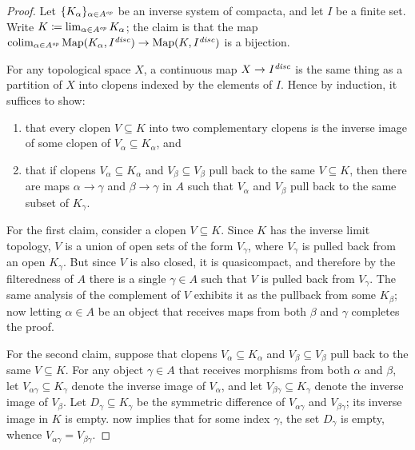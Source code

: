 \begin{proof}
	Let $ \{ K_{\alpha} \}_{\alpha \in A^{\textit{op}}} $ be an inverse system of compacta, and let $ I $ be a finite set.
	Write $ K \coloneq \lim_{\alpha \in A^{\textit{op}}} K_{\alpha} $;
	the claim is that the map $ \operatorname*{colim}_{\alpha \in A^{\textit{op}}} \operatorname{Map}(K_{\alpha}, I^{\textit{disc}}) \to \operatorname{Map}(K, I^{\textit{disc}}) $ is a bijection.

	For any topological space $ X $, a continuous map $ X \to I^{\textit{disc}} $ is the same thing as a partition of $ X $ into clopens indexed by the elements of $ I $.
	Hence by induction, it suffices to show:
	\begin{enumerate}[(1)]
		\item that every clopen $ V \subseteq K $ into two complementary clopens is the inverse image of some clopen of $ V_{\alpha} \subseteq K_{\alpha} $, and
		\item that if clopens $ V_{\alpha} \subseteq K_{\alpha} $ and $ V_{\beta} \subseteq V_{\beta} $ pull back to the same $ V \subseteq K $, then there are maps $ \alpha \to \gamma $ and $ \beta \to \gamma $ in $ A $ such that $ V_{\alpha} $ and $ V_{\beta} $ pull back to the same subset of $ K_{\gamma} $.
	\end{enumerate}

	For the first claim, consider a clopen $ V \subseteq K $.
	Since $ K $ has the inverse limit topology, $ V $ is a union of open sets of the form $ V_{\gamma} $, where $ V_{\gamma} $ is pulled back from an open $ K_{\gamma} $.
	But since $ V $ is also closed, it is quasicompact, and therefore by the filteredness of $ A $ there is a single $ \gamma \in A $ such that $ V $ is pulled back from $ V_{\gamma} $.
	The same analysis of the complement of $ V $ exhibits it as the pullback from some $ K_{\beta} $;
	now letting $ \alpha \in A $ be an object that receives maps from both $ \beta $ and $ \gamma $ completes the proof.

	For the second claim, suppose that clopens $ V_{\alpha} \subseteq K_{\alpha} $ and $ V_{\beta} \subseteq V_{\beta} $ pull back to the same $ V \subseteq K $.
	For any object $ \gamma \in A $ that receives morphisms from both $ \alpha $ and $ \beta $, let $ V_{\alpha\gamma} \subseteq K_{\gamma} $ denote the inverse image of $ V_{\alpha} $, and let $ V_{\beta\gamma} \subseteq K_{\gamma} $ denote the inverse image of $ V_{\beta} $.
	Let $D_{\gamma} \subseteq K_{\gamma} $ be the symmetric difference of $ V_{\alpha\gamma} $ and $ V_{\beta\gamma} $;
	its inverse image in $ K $ is empty.
	 now implies that for some index $\gamma$, the set $ D_{\gamma} $ is empty, whence $ V_{\alpha\gamma} = V_{\beta\gamma}$.
\end{proof}

